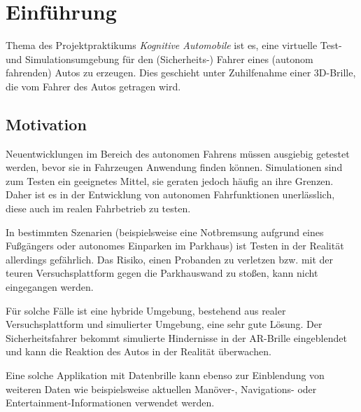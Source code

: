 
\section{Einführung}
\label{einleitung_sec}

Thema des Projektpraktikums \emph{Kognitive Automobile} ist es, eine virtuelle Test- und Simulationsumgebung für den (Sicherheits-) Fahrer eines (autonom fahrenden) Autos zu erzeugen.
Dies geschieht unter Zuhilfenahme einer 3D-Brille, die vom Fahrer des Autos getragen wird.



\subsection{Motivation}
\label{einleitung_motivation_subsec}


Neuentwicklungen im Bereich des autonomen Fahrens müssen ausgiebig getestet werden, bevor sie in  Fahrzeugen Anwendung finden können.
Simulationen sind zum Testen ein geeignetes Mittel, sie geraten jedoch häufig an ihre Grenzen.
Daher ist es in der Entwicklung von autonomen Fahrfunktionen unerlässlich, diese auch im realen Fahrbetrieb zu testen.

In bestimmten Szenarien (beispielsweise eine Notbremsung aufgrund eines Fußgängers oder autonomes Einparken im Parkhaus) ist Testen in der Realität allerdings gefährlich.
Das Risiko, einen Probanden zu verletzen bzw. mit der teuren Versuchsplattform gegen die Parkhauswand zu stoßen, kann nicht eingegangen werden.

Für solche Fälle ist eine hybride Umgebung, bestehend aus realer Versuchsplattform und simulierter Umgebung, eine sehr gute Lösung.
Der Sicherheitsfahrer bekommt simulierte Hindernisse in der \ac{AR}-Brille eingeblendet und kann die Reaktion des Autos in der Realität überwachen.

Eine solche Applikation mit Datenbrille kann ebenso zur Einblendung von weiteren Daten wie beispielsweise aktuellen Manöver-, Navigations- oder Entertainment-Informationen verwendet werden.





